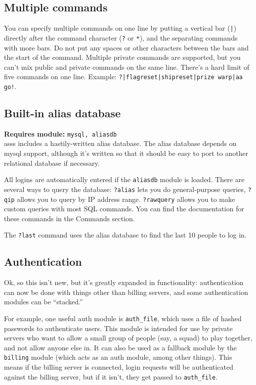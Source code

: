 \documentclass{article}
\newcommand{\asss}{asss}
\newcommand{\requiremod}[1]{\noindent\textbf{Requires module:} \texttt{#1}\\}
\begin{document}
\subsection{Multiple commands}

You can specify multiple commands on one line by putting a vertical bar
(\verb/|/) directly after the command character (\verb/?/ or \verb/*/),
and the separating commands with more bars. Do not put any spaces or
other characters between the bars and the start of the command. Multiple
private commands are supported, but you can't mix public and private
commands on the same line. There's a hard limit of five commands on one
line. Example: \verb/?|flagreset|shipreset|prize warp|aa go!/.


\subsection{Built-in alias database}

\requiremod{mysql, aliasdb}
\asss{} includes a hastily-written alias database. The alias database
depends on mysql support, although it's written so that it should be
easy to port to another relational database if necessary.

All logins are automatically entered if the \verb/aliasdb/ module is
loaded. There are several ways to query the database: \verb/?alias/ lets
you do general-purpose queries, \verb/?qip/ allows you to query by IP
address range. \verb/?rawquery/ allows you to make custom queries with
most SQL commands. You can find the documentation for these commands in
the Commands section.

The \verb/?last/ command uses the alias database to find the last 10
people to log in.


\subsection{Authentication}

Ok, so this isn't new, but it's greatly expanded in functionality:
authentication can now be done with things other than billing servers,
and some authentication modules can be ``stacked.''

For example, one useful auth module is \verb/auth_file/, which uses a
file of hashed passwords to authenticate users. This module is intended
for use by private servers who want to allow a small group of people
(say, a squad) to play together, and not allow anyone else in. It can
also be used as a fallback module by the \verb/billing/ module (which
acts as an auth module, among other things). This means if the billing
server is connected, login requests will be authenticated against the
billing server, but if it isn't, they get passed to \verb/auth_file/.
\end{document}
